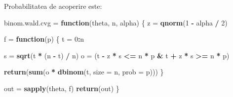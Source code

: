 \documentclass[]{article}
\newenvironment{Shaded}{\begin{snugshade}}{\end{snugshade}}
\newcommand{\KeywordTok}[1]{\textcolor[rgb]{0.13,0.29,0.53}{\textbf{#1}}}
\newcommand{\DataTypeTok}[1]{\textcolor[rgb]{0.13,0.29,0.53}{#1}}
\newcommand{\DecValTok}[1]{\textcolor[rgb]{0.00,0.00,0.81}{#1}}
\newcommand{\StringTok}[1]{\textcolor[rgb]{0.31,0.60,0.02}{#1}}
\newcommand{\ControlFlowTok}[1]{\textcolor[rgb]{0.13,0.29,0.53}{\textbf{#1}}}
\newcommand{\OperatorTok}[1]{\textcolor[rgb]{0.81,0.36,0.00}{\textbf{#1}}}
\newcommand{\NormalTok}[1]{#1}
\begin{document}
Probabilitatea de acoperire este:

\begin{Shaded}
\begin{Highlighting}[]
\NormalTok{binom.wald.cvg =}\StringTok{ }\ControlFlowTok{function}\NormalTok{(theta, n, alpha) \{}
\NormalTok{  z =}\StringTok{ }\KeywordTok{qnorm}\NormalTok{(}\DecValTok{1} \OperatorTok{-}\StringTok{ }\NormalTok{alpha }\OperatorTok{/}\StringTok{ }\DecValTok{2}\NormalTok{)}
  
\NormalTok{  f =}\StringTok{ }\ControlFlowTok{function}\NormalTok{(p) \{}
\NormalTok{    t =}\StringTok{ }\DecValTok{0}\OperatorTok{:}\NormalTok{n}

\NormalTok{    s =}\StringTok{ }\KeywordTok{sqrt}\NormalTok{(t }\OperatorTok{*}\StringTok{ }\NormalTok{(n }\OperatorTok{-}\StringTok{ }\NormalTok{t) }\OperatorTok{/}\StringTok{ }\NormalTok{n)}
\NormalTok{    o =}\StringTok{ }\NormalTok{(t }\OperatorTok{-}\StringTok{ }\NormalTok{z }\OperatorTok{*}\StringTok{ }\NormalTok{s }\OperatorTok{<=}\StringTok{ }\NormalTok{n }\OperatorTok{*}\StringTok{ }\NormalTok{p }\OperatorTok{&}\StringTok{ }\NormalTok{t }\OperatorTok{+}\StringTok{ }\NormalTok{z }\OperatorTok{*}\StringTok{ }\NormalTok{s }\OperatorTok{>=}\StringTok{ }\NormalTok{n }\OperatorTok{*}\StringTok{ }\NormalTok{p)}
  
    \KeywordTok{return}\NormalTok{(}\KeywordTok{sum}\NormalTok{(o }\OperatorTok{*}\StringTok{ }\KeywordTok{dbinom}\NormalTok{(t, }\DataTypeTok{size =}\NormalTok{ n, }\DataTypeTok{prob =}\NormalTok{ p)))}
\NormalTok{  \}}
  
\NormalTok{  out =}\StringTok{ }\KeywordTok{sapply}\NormalTok{(theta, f)}
  \KeywordTok{return}\NormalTok{(out)}
\NormalTok{\}}
\end{Highlighting}
\end{Shaded}
\end{document}
